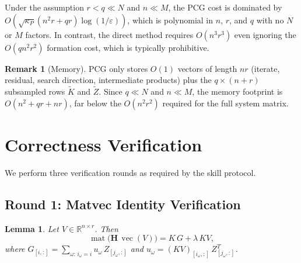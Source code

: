 \documentclass[12pt]{article}
\newtheorem{lemma}[theorem]{Lemma}
\theoremstyle{definition}
\newtheorem{remark}[theorem]{Remark}
\DeclareMathOperator{\vecop}{vec}
\DeclareMathOperator{\mat}{mat}
\newcommand{\R}{\mathbb{R}}
\newcommand{\bH}{\mathbf{H}}
\begin{document}
Under the assumption $r<q\ll N$ and $n\ll M$, the PCG cost is dominated by
$O(\sqrt{\kappa_P}(n^2r+qr)\log(1/\varepsilon))$, which is polynomial in $n$,
$r$, and $q$ with no $N$ or $M$ factors.  In contrast, the direct method
requires $O(n^3r^3)$ even ignoring the $O(qn^2r^2)$ formation cost, which is
typically prohibitive.

\begin{remark}[Memory]
  PCG only stores $O(1)$ vectors of length $nr$ (iterate, residual, search
  direction, intermediate products) plus the $q\times(n+r)$ subsampled rows
  $\widetilde{K}$ and $\widetilde{Z}$.  Since $q\ll N$ and $n\ll M$, the
  memory footprint is $O(n^2+qr+nr)$, far below the $O(n^2r^2)$ required for
  the full system matrix.
\end{remark}

\section{Correctness Verification}

We perform three verification rounds as required by the skill protocol.

\subsection{Round 1: Matvec Identity Verification}

\begin{lemma}\label{lem:matvec}
  Let $V\in\R^{n\times r}$.  Then
  \[
    \mat\!\bigl(\bH\,\vecop(V)\bigr)
    = K\,G + \lambda\,KV,
  \]
  where $G_{[i,:]} = \sum_{\omega:\,i_\omega=i} u_\omega\,Z_{[j_\omega,:]}$
  and $u_\omega = (KV)_{[i_\omega,:]}\,Z_{[j_\omega,:]}^T$.
\end{lemma}
\end{document}
